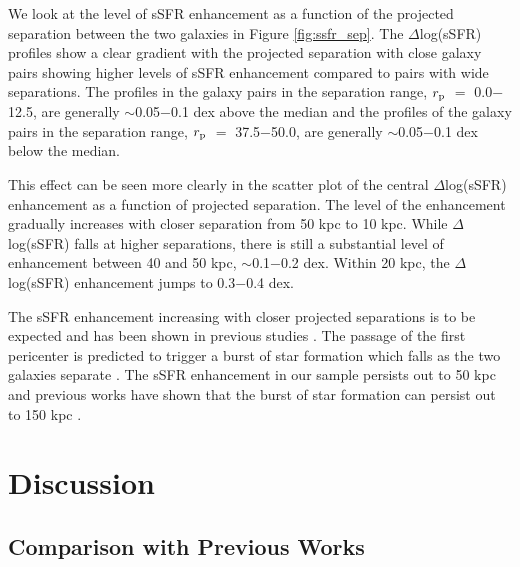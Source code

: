 \documentclass[iop,revtex4,twocolumn,apj,numberedappendix,appendixfloats]{emulateapj}
\begin{document}
We look at the level of sSFR enhancement as a function of the projected separation between the two galaxies in Figure \ref{fig:ssfr_sep}. The $\Delta$log(sSFR) profiles show a clear gradient with the projected separation with close galaxy pairs showing higher levels of sSFR enhancement compared to pairs with wide separations. The profiles in the galaxy pairs in the separation range, $r_{\rm p}$ $=$ 0.0$-$12.5, are generally $\sim$0.05$-$0.1 dex above the median and the profiles of the galaxy pairs in the separation range, $r_{\rm p}$ $=$ 37.5$-$50.0, are generally $\sim$0.05$-$0.1 dex below the median. 

This effect can be seen more clearly in the scatter plot of the central $\Delta$log(sSFR) enhancement as a function of projected separation. The level of the enhancement gradually increases with closer separation from 50 kpc to 10 kpc. While $\Delta$log(sSFR) falls at higher separations, there is still a substantial level of enhancement between 40 and 50 kpc, $\sim$0.1$-$0.2 dex. Within 20 kpc, the $\Delta$log(sSFR) enhancement jumps to 0.3$-$0.4 dex. 

The sSFR enhancement increasing with closer projected separations is to be expected and has been shown in previous studies \citep{Li:2008, Ellison:2008, Scudder:2012, Patton:2013}. The passage of the first pericenter is predicted to trigger a burst of star formation which falls as the two galaxies separate \citep{Scudder:2012}. The sSFR enhancement in our sample persists out to 50 kpc and previous works have shown that the burst of star formation can persist out to 150 kpc \citep{Patton:2013}. 

\section{Discussion}\label{sec:disc}

\subsection{Comparison with Previous Works}
\end{document}
